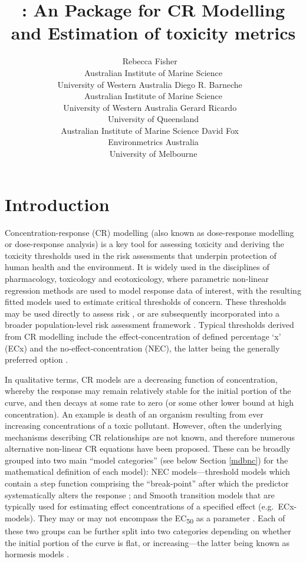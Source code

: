 \documentclass[
  shortnames]{jss}
\author{
			Rebecca Fisher
					~\orcidlink{0000-0001-5148-6731}
				\\
		Australian Institute of Marine Science
					\\University of Western Australia
				 \AND
			Diego R. Barneche
					~\orcidlink{0000-0002-4568-2362}
				\\
		Australian Institute of Marine Science
					\\University of Western Australia
				 \AND
			Gerard Ricardo
					~\orcidlink{0000-0002-7761-0806}
				\\
		University of Queensland
					\\Australian Institute of Marine Science
				 \AND
			David Fox
					~\orcidlink{0000-0002-3178-7243}
				\\
		Environmetrics Australia
					\\University of Melbourne
				}
\title{\pkg{bayesnec}: An \proglang{R} Package for CR Modelling and Estimation of toxicity metrics}
\begin{document}
\hypertarget{introduction}{%
\section{Introduction}\label{introduction}}

Concentration-response (CR) modelling (also known as dose-response modelling or dose-response analysis) is a key tool for assessing toxicity and deriving the toxicity thresholds used in the risk assessments that underpin protection of human health and the environment. It is widely used in the disciplines of pharmacology, toxicology and ecotoxicology, where parametric non-linear regression methods are used to model response data of interest, with the resulting fitted models used to estimate critical thresholds of concern. These thresholds may be used directly to assess risk \citep[e.g see][]{fisher2018c}, or are subsequently incorporated into a broader population-level risk assessment framework \citep[e.g.][]{Warne2015}. Typical thresholds derived from CR modelling include the effect-concentration of defined percentage `x' (ECx) and the no-effect-concentration (NEC), the latter being the generally preferred option \citep{Fox2008, Warne2015, Warne2018c}.

In qualitative terms, CR models are a decreasing function of concentration, whereby the response may remain relatively stable for the initial portion of the curve, and then decays at some rate to zero (or some other lower bound at high concentration). An example is death of an organism resulting from ever increasing concentrations of a toxic pollutant. However, often the underlying mechanisms describing CR relationships are not known, and therefore numerous alternative non-linear CR equations have been proposed. These can be broadly grouped into two main ``model categories'' (see below Section \ref{mdbnc}) for the mathematical definition of each model): NEC models---threshold models which contain a step function comprising the ``break-point'' after which the predictor systematically alters the response \citep{Fox2010}; and Smooth transition models that are typically used for estimating effect concentrations of a specified effect (e.g.~ECx- models). They may or may not encompass the EC\textsubscript{50} as a parameter \citep{Ritz2016}. Each of these two groups can be further split into two categories depending on whether the initial portion of the curve is flat, or increasing---the latter being known as hormesis models \citep{Ritz2016}.
\end{document}
